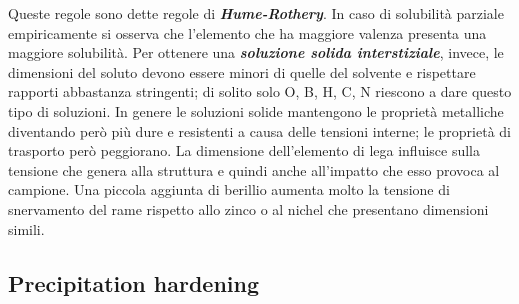 Queste regole sono dette regole di \textbf{\textit{Hume-Rothery}}. In caso di solubilità parziale empiricamente si osserva che l'elemento che ha maggiore valenza presenta una maggiore solubilità.
Per ottenere una \textbf{\textit{soluzione solida interstiziale}}, invece, le dimensioni del soluto devono essere minori di quelle del solvente e rispettare rapporti abbastanza stringenti; di solito solo O, B, H, C, N riescono a dare questo tipo di soluzioni.
In genere le soluzioni solide mantengono le proprietà metalliche diventando però più dure e resistenti a causa delle tensioni interne; le proprietà di trasporto però peggiorano.
La dimensione dell'elemento di lega influisce sulla tensione che genera alla struttura e quindi anche all'impatto che esso provoca al campione. Una piccola aggiunta di berillio aumenta molto la tensione di snervamento del rame rispetto allo zinco o al nichel che presentano dimensioni simili.

\subsection{Precipitation hardening}

